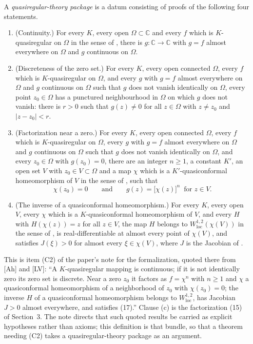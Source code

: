 \begin{definition}
A \emph{quasiregular-theory package} is a datum consisting of proofs of the
following four statements.
\begin{enumerate}
\item[(a)] (Continuity.)  For every $K$, every open $\Omega\subset\mathbb{C}$
and every $f$ which is $K$-quasiregular on $\Omega$ in the sense of
, there is $g\colon\mathbb{C}\to\mathbb{C}$ with
$g=f$ almost everywhere on $\Omega$ and $g$ continuous on $\Omega$.

\item[(b)] (Discreteness of the zero set.)  For every $K$, every open
connected $\Omega$, every $f$ which is $K$-quasiregular on $\Omega$, and every
$g$ with $g=f$ almost everywhere on $\Omega$ and $g$ continuous on $\Omega$
such that $g$ does not vanish identically on $\Omega$, every point
$z_0\in\Omega$ has a punctured neighbourhood in $\Omega$ on which $g$ does not
vanish: there is $r>0$ such that $g(z)\neq0$ for all $z\in\Omega$ with
$z\neq z_0$ and $|z-z_0|<r$.

\item[(c)] (Factorization near a zero.)  For every $K$, every open connected
$\Omega$, every $f$ which is $K$-quasiregular on $\Omega$, every $g$ with
$g=f$ almost everywhere on $\Omega$ and $g$ continuous on $\Omega$ such that
$g$ does not vanish identically on $\Omega$, and every $z_0\in\Omega$ with
$g(z_0)=0$, there are an integer $n\ge1$, a constant $K'$, an open set $V$
with $z_0\in V\subset\Omega$ and a map $\chi$ which is a $K'$-quasiconformal
homeomorphism of $V$ in the sense of , such that
\[
  \chi(z_0)=0\qquad\text{and}\qquad g(z)=\bigl[\chi(z)\bigr]^n\ \text{ for }z\in V .
\]

\item[(d)] (The inverse of a quasiconformal homeomorphism.)  For every $K$,
every open $V$, every $\chi$ which is a $K$-quasiconformal homeomorphism of
$V$, and every $H$ with $H(\chi(z))=z$ for all $z\in V$, the map $H$ belongs
to $W^{1,2}_{\mathrm{loc}}(\chi(V))$ in the sense of , is
real-differentiable at almost every point of $\chi(V)$, and satisfies
$J(\xi)>0$ for almost every $\xi\in\chi(V)$, where $J$ is the Jacobian of
.
\end{enumerate}

This is item (C2) of the paper's note for the formalization, quoted there from
[Ah] and [LV]: ``A $K$-quasiregular mapping is continuous; if it is
not identically zero its zero set is discrete.  Near a zero $z_0$ it factors
as $f=\chi^n$ with $n\ge1$ and $\chi$ a quasiconformal homeomorphism of a
neighborhood of $z_0$ with $\chi(z_0)=0$; the inverse $H$ of a quasiconformal
homeomorphism belongs to $W^{1,2}_{\mathrm{loc}}$, has Jacobian $J>0$ almost
everywhere, and satisfies (17).''  Clause (c) is the factorization (15) of
Section~3.  The note directs that such quoted results be carried as explicit
hypotheses rather than axioms; this definition is that bundle, so that a
theorem needing (C2) takes a quasiregular-theory package as an argument.


\end{definition}
